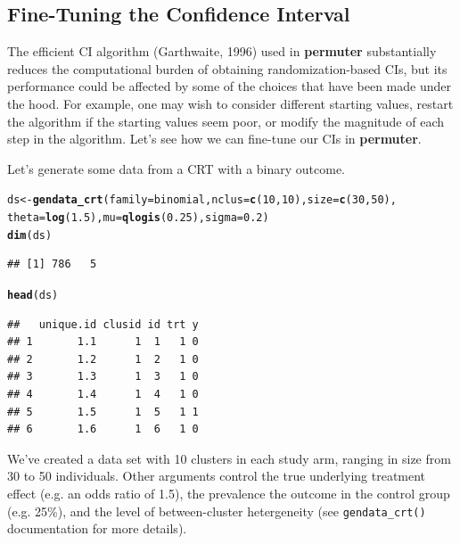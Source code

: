 \documentclass[12pt]{article}\usepackage[]{graphicx}\usepackage[]{color}
\makeatletter
\newcommand{\hlnum}[1]{\textcolor[rgb]{0.686,0.059,0.569}{#1}}%
\newcommand{\hlstd}[1]{\textcolor[rgb]{0.345,0.345,0.345}{#1}}%
\newcommand{\hlkwb}[1]{\textcolor[rgb]{0.69,0.353,0.396}{#1}}%
\newcommand{\hlkwc}[1]{\textcolor[rgb]{0.333,0.667,0.333}{#1}}%
\newcommand{\hlkwd}[1]{\textcolor[rgb]{0.737,0.353,0.396}{\textbf{#1}}}%
\newenvironment{kframe}{%
 \def\at@end@of@kframe{}%
 \ifinner\ifhmode%
  \def\at@end@of@kframe{\end{minipage}}%
  \begin{minipage}{\columnwidth}%
 \fi\fi%
 \def\FrameCommand##1{\hskip\@totalleftmargin \hskip-\fboxsep
 \colorbox{shadecolor}{##1}\hskip-\fboxsep
     \hskip-\linewidth \hskip-\@totalleftmargin \hskip\columnwidth}%
 \MakeFramed {\advance\hsize-\width
   \@totalleftmargin\z@ \linewidth\hsize
   \@setminipage}}%
 {\par\unskip\endMakeFramed%
 \at@end@of@kframe}
\newenvironment{knitrout}{}{} %
\makeatother
\begin{document}
\subsection{Fine-Tuning the Confidence Interval}
The efficient CI algorithm (Garthwaite, 1996) used in \textbf{permuter} substantially reduces the computational burden of obtaining randomization-based CIs, but its performance could be affected by some of the choices that have been made under the hood. For example, one may wish to consider different starting values, restart the algorithm if the starting values seem poor, or modify the magnitude of each step in the algorithm. Let's see how we can fine-tune our CIs in \textbf{permuter}.

Let's generate some data from a CRT with a binary outcome.
\begin{knitrout}
\color{fgcolor}\begin{kframe}
\begin{alltt}
\hlstd{ds} \hlkwb{<-} \hlkwd{gendata_crt}\hlstd{(}\hlkwc{family} \hlstd{= binomial,} \hlkwc{nclus} \hlstd{=} \hlkwd{c}\hlstd{(}\hlnum{10}\hlstd{,} \hlnum{10}\hlstd{),} \hlkwc{size} \hlstd{=} \hlkwd{c}\hlstd{(}\hlnum{30}\hlstd{,} \hlnum{50}\hlstd{),}
                  \hlkwc{theta} \hlstd{=} \hlkwd{log}\hlstd{(}\hlnum{1.5}\hlstd{),} \hlkwc{mu} \hlstd{=} \hlkwd{qlogis}\hlstd{(}\hlnum{0.25}\hlstd{),} \hlkwc{sigma} \hlstd{=} \hlnum{0.2}\hlstd{)}
\hlkwd{dim}\hlstd{(ds)}
\end{alltt}
\begin{verbatim}
## [1] 786   5
\end{verbatim}
\begin{alltt}
\hlkwd{head}\hlstd{(ds)}
\end{alltt}
\begin{verbatim}
##   unique.id clusid id trt y
## 1       1.1      1  1   1 0
## 2       1.2      1  2   1 0
## 3       1.3      1  3   1 0
## 4       1.4      1  4   1 0
## 5       1.5      1  5   1 1
## 6       1.6      1  6   1 0
\end{verbatim}
\end{kframe}
\end{knitrout}
We've created a data set with 10 clusters in each study arm, ranging in size from 30 to 50 individuals. Other arguments control the true underlying treatment effect (e.g. an odds ratio of 1.5), the prevalence the outcome in the control group (e.g. 25\%), and the level of between-cluster hetergeneity (see \texttt{gendata\_crt()} documentation for more details).
\end{document}
